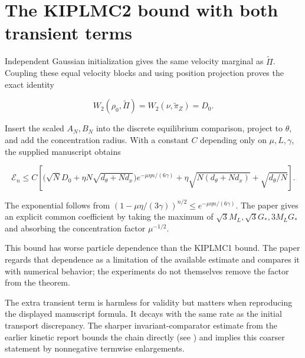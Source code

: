 \documentclass[11pt,a4paper]{report}
\begin{document}
\section{\texorpdfstring{The KIPLMC2 bound with both transient terms}{The KIPLMC2 bound with both transient terms}}


Independent Gaussian initialization gives the same velocity marginal as
\(\widetilde\Pi\). Coupling these equal velocity blocks and using position
projection proves the exact identity


\[W_2(\rho_0,\widetilde\Pi)
=W_2(\nu,\widetilde\pi_Z)=D_0.\]


Insert the scaled \(A_N,B_N\) into the discrete equilibrium comparison,
project to \(\theta\), and add the concentration radius. With a constant
\(C\) depending only on \(\mu,L,\gamma\), the supplied manuscript obtains


\[\mathcal E_n\le C\left[
\bigl(\sqrt N D_0+\eta N\sqrt{d_\theta+Nd_x}\bigr)
e^{-\mu\eta n/(6\gamma)}
+\eta\sqrt{N(d_\theta+Nd_x)}
+\sqrt{d_\theta/N}\right].\]


The exponential follows from
\((1-\mu\eta/(3\gamma))^{n/2}\le e^{-\mu\eta n/(6\gamma)}\).
The paper gives an explicit common coefficient by taking the maximum of
\(\sqrt3M_L,\sqrt3G_*,3M_LG_*\) and absorbing the concentration factor
\(\mu^{-1/2}\).




This bound has worse particle dependence than the KIPLMC1 bound. The paper
regards that dependence as a limitation of the available estimate and compares
it with numerical behavior; the experiments do not themselves remove the
factor from the theorem.



The extra transient term is harmless for validity but matters when reproducing the displayed manuscript formula. It decays with the same rate as the initial transport discrepancy. The sharper invariant-comparator estimate from the earlier kinetic report bounds the chain directly (see \cite[Section~3.123.4]{LangevinLean2026Kinetic}) and implies this coarser statement by nonnegative termwise enlargements.
\end{document}
